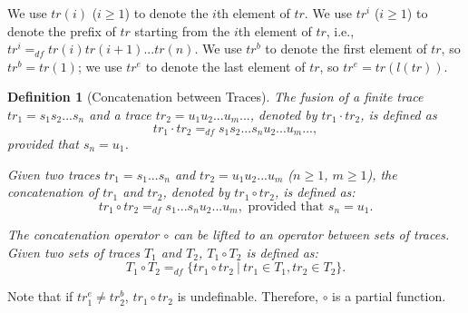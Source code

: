 \documentclass{fcs}
\newtheorem{mydef}{Definition}[section]
\newcommand{\fus}[0]{\cdot}
\newcommand{\dddef}[0]{=_{df}}
\begin{document}
	We use $tr(i)$ ($i\ge 1$) to denote the $i$th element of $tr$.
	We use $tr^i$ ($i\ge 1$) to denote the prefix of $tr$ starting from the $i$th element of $tr$, i.e.,
	$tr^i \dddef tr(i)tr(i+1)...tr(n)$.
	We use $tr^b$ to denote the first element of $tr$, so $tr^b = tr(1)$; we use
	$tr^e$ to denote the last element of $tr$, so $tr^e = tr(l(tr))$.


\begin{mydef}[Concatenation between Traces]
	\label{def:Concatenation between Traces}
	\ifx
	The fusion of a finite trace $tr_1 = s_1s_2...s_n$ and a trace $tr_2 = u_1u_2...u_m...$, denoted by $tr_1\fus tr_2$, is defined as
	$$tr_1\fus tr_2 \dddef s_1s_2...s_nu_2...u_m...,$$
	provided that $s_n = u_1$.
	\fi
	
	Given two traces $tr_1 = s_1...s_n$ and $tr_2 = u_1u_2...u_m$ ($n\ge 1$, $m\ge 1$),
	the concatenation of $tr_1$ and $tr_2$, denoted by $tr_1\circ tr_2$, is defined as:
	$$tr_1\circ tr_2\dddef
		s_1...s_nu_2...u_m,\mbox{ provided that $s_n = u_1$}.$$
	
	The concatenation operator $\circ$ can be lifted to an operator between sets of traces.
	Given two sets of traces $T_1$ and $T_2$, $T_1\circ T_2$ is defined as:
	$$T_1\circ T_2\dddef \{tr_1\circ tr_2\ |\ tr_1\in T_1, tr_2\in T_2\}.$$
\end{mydef}

Note that if $tr^e_1\neq tr^b_{2}$, $tr_1\circ tr_2$ is undefinable. Therefore, $\circ$ is a partial function.
\end{document}
